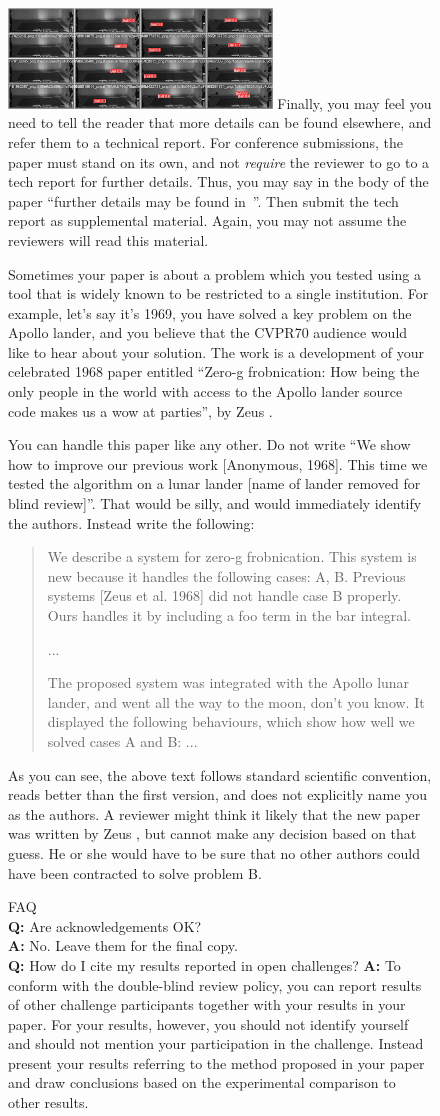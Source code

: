 \documentclass[10pt,twocolumn,letterpaper]{article}
\begin{document}
\begin{figure}{
  \includegraphics[width=7cm]{validation.jpeg}
}
Finally, you may feel you need to tell the reader that more details can be found elsewhere, and refer them to a technical report.
For conference submissions, the paper must stand on its own, and not {\em require} the reviewer to go to a tech report for further details.
Thus, you may say in the body of the paper ``further details may be found in~\cite{Authors14b}''.
Then submit the tech report as supplemental material.
Again, you may not assume the reviewers will read this material.

Sometimes your paper is about a problem which you tested using a tool that is widely known to be restricted to a single institution.
For example, let's say it's 1969, you have solved a key problem on the Apollo lander, and you believe that the CVPR70 audience would like to hear about your
solution.
The work is a development of your celebrated 1968 paper entitled ``Zero-g frobnication: How being the only people in the world with access to the Apollo lander source code makes us a wow at parties'', by Zeus \etal.

You can handle this paper like any other.
Do not write ``We show how to improve our previous work [Anonymous, 1968].
This time we tested the algorithm on a lunar lander [name of lander removed for blind review]''.
That would be silly, and would immediately identify the authors.
Instead write the following:
\begin{quotation}
\noindent
   We describe a system for zero-g frobnication.
   This system is new because it handles the following cases:
   A, B.  Previous systems [Zeus et al. 1968] did not  handle case B properly.
   Ours handles it by including a foo term in the bar integral.

   ...

   The proposed system was integrated with the Apollo lunar lander, and went all the way to the moon, don't you know.
   It displayed the following behaviours, which show how well we solved cases A and B: ...
\end{quotation}
As you can see, the above text follows standard scientific convention, reads better than the first version, and does not explicitly name you as the authors.
A reviewer might think it likely that the new paper was written by Zeus \etal, but cannot make any decision based on that guess.
He or she would have to be sure that no other authors could have been contracted to solve problem B.
\medskip

\noindent
FAQ\medskip\\
{\bf Q:} Are acknowledgements OK?\\
{\bf A:} No.  Leave them for the final copy.\medskip\\
{\bf Q:} How do I cite my results reported in open challenges?
{\bf A:} To conform with the double-blind review policy, you can report results of other challenge participants together with your results in your paper.
For your results, however, you should not identify yourself and should not mention your participation in the challenge.
Instead present your results referring to the method proposed in your paper and draw conclusions based on the experimental comparison to other results.\medskip\\


\end{figure}
\end{document}
